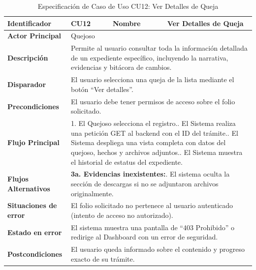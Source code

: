 \vspace{0.8cm}

\begingroup
\setlength{\parskip}{0pt}
\begin{longtable}{|p{3.5cm}|p{2cm}|p{2.5cm}|p{7cm}|}
\caption{Especificación de Caso de Uso CU12: Ver Detalles de Queja}
\label{tab:cu12_ver_detalles} \\
\hline
\textbf{Identificador} & CU12 & \textbf{Nombre} & Ver Detalles de Queja \\ \hline
\textbf{Actor Principal} & \multicolumn{3}{p{11.5cm}|}{Quejoso} \\ \hline
\textbf{Descripción} & \multicolumn{3}{p{11.5cm}|}{Permite al usuario consultar toda la información detallada de un expediente específico, incluyendo la narrativa, evidencias y bitácora de cambios.} \\ \hline
\textbf{Disparador} & \multicolumn{3}{p{11.5cm}|}{El usuario selecciona una queja de la lista mediante el botón ``Ver detalles''.} \\ \hline
\textbf{Precondiciones} & \multicolumn{3}{p{11.5cm}|}{El usuario debe tener permisos de acceso sobre el folio solicitado.} \\ \hline
\textbf{Flujo Principal} & \multicolumn{3}{p{11.5cm}|}{1. El Quejoso selecciona el registro.\newline 2. El Sistema realiza una petición GET al backend con el ID del trámite.\newline 3. El Sistema despliega una vista completa con datos del quejoso, hechos y archivos adjuntos.\newline 4. El Sistema muestra el historial de estatus del expediente.} \\ \hline
\textbf{Flujos Alternativos} & \multicolumn{3}{p{11.5cm}|}{\textbf{3a. Evidencias inexistentes:}\newline 1. El sistema oculta la sección de descargas si no se adjuntaron archivos originalmente.} \\ \hline
\textbf{Situaciones de error} & \multicolumn{3}{p{11.5cm}|}{El folio solicitado no pertenece al usuario autenticado (intento de acceso no autorizado).} \\ \hline
\textbf{Estado en error} & \multicolumn{3}{p{11.5cm}|}{El sistema muestra una pantalla de ``403 Prohibido'' o redirige al Dashboard con un error de seguridad.} \\ \hline
\textbf{Postcondiciones} & \multicolumn{3}{p{11.5cm}|}{El usuario queda informado sobre el contenido y progreso exacto de su trámite.} \\ \hline
\end{longtable}
\endgroup


